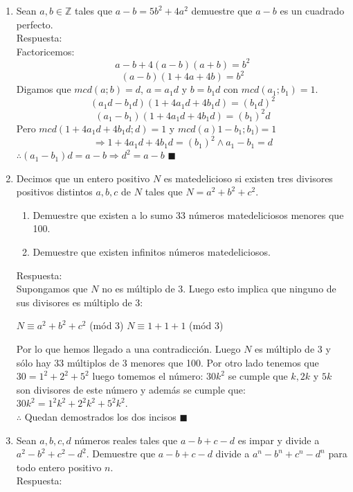 \documentclass{book}
\newcommand{\Z}{\mathbb{Z}} \def\max{\mathop{\mbox{\rm máx}}} %
\begin{document}
\begin{enumerate}
        \item Sean $a,b\in \Z$ tales que $a-b=5b^2+4a^2$ demuestre que $a-b$ es un cuadrado perfecto.\\
        Respuesta:\\
        Factoricemos:
        $$a - b + 4(a - b)(a + b) = b^2$$
        $$(a-b)(1 + 4a + 4b) = b^2$$
        Digamos que $mcd(a;b) = d$, $a = a_1d$ y $b = b_1d$ con $mcd(a_1;b_1) = 1$.                    $$(a_1d - b_1d)(1 + 4a_1d + 4b_1d) = (b_1d)^2$$
        $$(a_1 - b_1)(1 + 4a_1d + 4b_1d) = (b_1)^2d$$
        Pero $mcd(1 + 4a_1d + 4b_1d;d) = 1$ y $mcd(a)1 - b_1;b_1) = 1$
        $$\Rightarrow 1 + 4a_1d + 4b_1d = (b_1)^2 \wedge a_1 - b_1 = d$$
        $\therefore (a_1 - b_1)d = a - b \Rightarrow d^2 = a - b$ $\blacksquare$ \\
        \item Decimos que un entero positivo $N$ es matedelicioso si existen tres divisores positivos distintos $a,b,c$ de $N$ tales que $N = a^2 + b^2 + c^2$.
        \begin{enumerate}
            \item Demuestre que existen a lo sumo 33 números matedeliciosos menores que 100.
            \item Demuestre que existen infinitos números matedeliciosos.
        \end{enumerate}
        Respuesta:\\
        Supongamos que $N$ no es múltiplo de 3. Luego esto implica que ninguno de sus divisores es múltiplo de 3:
        \begin{center}
            $N\equiv a^2 + b^2 + c^2$ (mód 3)
            $N\equiv  1 + 1 + 1$ (mód 3)
        \end{center}
        Por lo que hemos llegado a una contradicción. Luego $N$ es múltiplo de 3 y sólo hay 33 múltiplos de 3 menores que 100. Por otro lado tenemos que $30 = 1^2 + 2^2 + 5^2$ luego tomemos el número: $30k^2$ se cumple que $k,2k$ y $5k$ son divisores de este número y además se cumple que: $30k^2 = 1^2k^2 + 2^2k^2 + 5^2k^2$.\\
        $\therefore$ Quedan demostrados los dos incisos $\blacksquare$ \\
        \item Sean $a,b,c,d$ números reales tales que $a-b+c-d$ es impar y divide a $a^2-b^2+c^2-d^2$. Demuestre que
        $a-b+c-d$ divide a $a^n-b^n+c^n-d^n$ para todo entero positivo $n$.\\
        Respuesta:\\

\end{enumerate}
\end{document}
